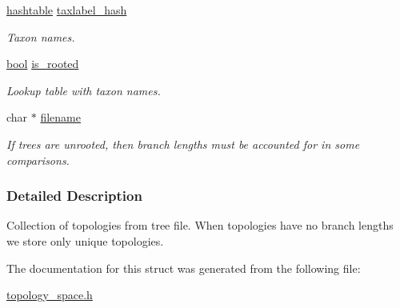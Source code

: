 \begin{DoxyCompactItemize}
\mbox{\label{structtopology__space__struct_ae8c62b1c65eedf80b1df6cea3e35ca7b}} 
\hyperlink{structhashtable__struct}{hashtable} \hyperlink{structtopology__space__struct_ae8c62b1c65eedf80b1df6cea3e35ca7b}{taxlabel\+\_\+hash}
\begin{DoxyCompactList}\small\item\em Taxon names. \end{DoxyCompactList}\item 
\mbox{\label{structtopology__space__struct_a593fcc350fe442e1c4e8c7cec3474acd}} 
\hyperlink{lowlevel_8h_a97a80ca1602ebf2303258971a2c938e2}{bool} \hyperlink{structtopology__space__struct_a593fcc350fe442e1c4e8c7cec3474acd}{is\+\_\+rooted}
\begin{DoxyCompactList}\small\item\em Lookup table with taxon names. \end{DoxyCompactList}\item 
\mbox{\label{structtopology__space__struct_a711d7574fc7468e6c8098c08b1391e57}} 
char $\ast$ \hyperlink{structtopology__space__struct_a711d7574fc7468e6c8098c08b1391e57}{filename}
\begin{DoxyCompactList}\small\item\em If trees are unrooted, then branch lengths must be accounted for in some comparisons. \end{DoxyCompactList}\end{DoxyCompactItemize}


\subsubsection{Detailed Description}
Collection of topologies from tree file. When topologies have no branch lengths we store only unique topologies. 

The documentation for this struct was generated from the following file\+:\begin{DoxyCompactItemize}
\item 
\hyperlink{topology__space_8h}{topology\+\_\+space.\+h}\end{DoxyCompactItemize}
